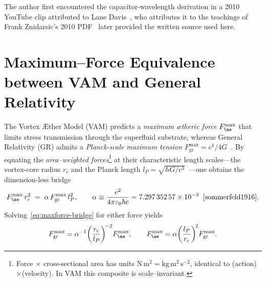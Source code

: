     The author first encountered the capacitor-wavelength derivation in a 2010 YouTube clip attributed to Lane Davis~\cite{davis2010_video}, who attributes it to the teachings of Frank Znidarsic's 2010 PDF~\cite{znidarsic2010} later provided the written source used here.


\section{Maximum–Force Equivalence between VAM and General Relativity}
\label{sec:maxforce-equivalence}

    The Vortex Æther Model (VAM) predicts a \emph{maximum ætheric force} \(F_{\ae}^{\max}\) that limits stress transmission through the superfluid substrate, whereas General Relativity (GR) admits a \emph{Planck-scale maximum tension} \(F_{\mathrm{gr}}^{\max}=c^{4}/4G\)~\cite{gibbons2002}.
    By equating the \emph{area–weighted forces}\footnote{Force $\times$ cross-sectional area has units $\mathrm{N\,m^{2}}=\mathrm{kg\,m^{2}\,s^{-2}}$, identical to (action)$\times$(velocity).  In VAM this composite is scale--invariant.} at their characteristic length scales—the vortex-core radius \(r_{c}\) and the Planck length \(l_{P}=\sqrt{\hbar G/c^{3}}\)~\cite{planck1899}—one obtains the dimension-less bridge
    \begin{equation}
        F_{\ae}^{\max}\,r_{c}^{2}
        \;=\;
        \alpha\,F_{\mathrm{gr}}^{\max}\,l_{P}^{2},
        \qquad
        \alpha
        \equiv
        \frac{e^{2}}{4\pi\varepsilon_{0}\hbar c}
        =7.297\,352\,57\times10^{-3}
        \;\;\cite{sommerfeld1916}.
        \label{eq:maxforce-bridge}
    \end{equation}
    Solving~\eqref{eq:maxforce-bridge} for either force yields
    \begin{equation}
        F_{\mathrm{gr}}^{\max}
        =
        \alpha^{-1}
        \!\left(\frac{r_{c}}{l_{P}}\right)^{\!-2}\!
        F_{\ae}^{\max},
        \qquad
        F_{\ae}^{\max}
        =
        \alpha
        \!\left(\frac{l_{P}}{r_{c}}\right)^{\!2}\!
        F_{\mathrm{gr}}^{\max}.
        \label{eq:maxforce-rescale}
    \end{equation}

